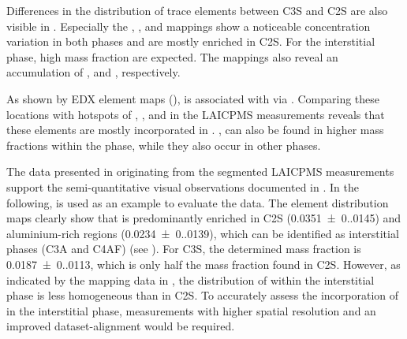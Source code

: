 
Differences in the distribution of trace elements between \ac{C3S} and \ac{C2S} are also visible in .
Especially the , , and  mappings show a noticeable concentration variation in both phases and are mostly enriched in \ac{C2S}.
For the interstitial phase, high  mass fraction are expected.
The mappings also reveal an accumulation of , and , respectively.

As shown by \ac{EDX} element maps (),  is associated with  via .
Comparing these locations with hotspots of , , and  in the \ac{LAICPMS} measurements reveals that these elements are mostly incorporated in .
,  can also be found in higher mass fractions within the  phase, while they also occur in other phases.

The data presented in  originating from the segmented \ac{LAICPMS} measurements support the semi-quantitative visual observations documented in .
In the following,  is used as an example to evaluate the data.
The element distribution maps clearly show that  is predominantly enriched in \ac{C2S} (\qty{0.0351(0.0145)}{\wtpercent}) and aluminium-rich regions (\qty{0.0234(0.0139)}{\wtpercent}), which can be identified as interstitial phases (\ac{C3A} and \ac{C4AF}) (see ).
For \ac{C3S}, the determined  mass fraction is \qty{0.0187(0.0113)}{\wtpercent}, which is only half the mass fraction found in \ac{C2S}.
However, as indicated by the mapping data in , the distribution of  within the interstitial phase is less homogeneous than in \ac{C2S}.
To accurately assess the incorporation of  in the interstitial phase, measurements with higher spatial resolution and an improved dataset-alignment would be required.

